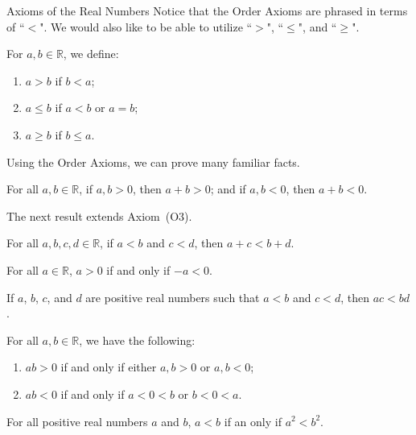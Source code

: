 \begin{section}{Axioms of the Real Numbers}
Notice that the Order Axioms are phrased in terms of ``$<$". We would also like to be able to utilize ``$>$", ``$\leq$", and ``$\geq$".

\begin{definition}
For $a,b\in\mathbb{R}$, we define:
\begin{enumerate}[label=\textrm{(\alph*)}]
\item $\boxed{a>b}$ if $b<a$;
\item $\boxed{a\leq b}$ if $a<b$ or $a=b$;
\item $\boxed{a\geq b}$ if $b\leq a$.
\end{enumerate}
\end{definition}

Using the Order Axioms, we can prove many familiar facts. 

\begin{theorem}
For all $a,b\in\mathbb{R}$, if $a,b>0$, then $a+b>0$; and if $a,b<0$, then $a+b<0$.
\end{theorem}

The next result extends Axiom~(O3).

\begin{theorem}
For all $a,b,c,d\in\mathbb{R}$, if $a<b$ and $c<d$, then $a+c<b+d$.
\end{theorem}

\begin{theorem}\label{thm:additive inverse of a positive is negative}
For all $a\in\mathbb{R}$, $a>0$ if and only if $-a<0$.
\end{theorem}

\begin{theorem}
If $a$, $b$, $c$, and $d$ are positive real numbers such that $a<b$ and $c<d$, then $ac<bd$.
\end{theorem}

\begin{theorem}
For all $a,b\in\mathbb{R}$, we have the following:
\begin{enumerate}[label=\textrm{(\alph*)}]
\item $ab>0$ if and only if either $a,b>0$ or $a,b<0$;
\item $ab<0$ if and only if $a<0<b$ or $b<0<a$.
\end{enumerate}
\end{theorem}

\begin{theorem}
For all positive real numbers $a$ and $b$, $a< b$ if an only if $a^2< b^2$.
\end{theorem}


\end{section}

